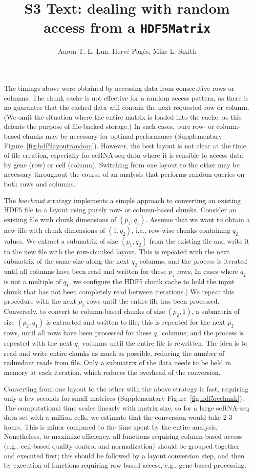 \documentclass{article}
\title{S3 Text: dealing with random access from a \texttt{HDF5Matrix}}
\author{Aaron T. L. Lun, Herv\'e Pag\`es, Mike L. Smith}
\newcommand{\beachmat}{\textit{beachmat}}
\begin{document}
\maketitle

\noindent
The timings above were obtained by accessing data from consecutive rows or columns.
The chunk cache is not effective for a random access pattern, as there is no guarantee that the cached data will contain the next requested row or column.
(We omit the situation where the entire matrix is loaded into the cache, as this defeats the purpose of file-backed storage.)
In such cases, pure row- or column-based chunks may be necessary for optimal performance (Supplementary Figure~\ref{fig:hdf5layoutrandom}).
However, the best layout is not clear at the time of file creation, especially for scRNA-seq data where it is sensible to access data by gene (row) or cell (column).
Switching from one layout to the other may be necessary throughout the course of an analysis that performs random queries on both rows and columns.

The \beachmat{} strategy implements a simple approach to converting an existing HDF5 file to a layout using purely row- or column-based chunks.
Consider an existing file with chunk dimensions of $(p_1, q_1)$. 
Assume that we want to obtain a new file with chunk dimensions of $(1, q_2)$, i.e., row-wise chunks containing $q_2$ values.
We extract a submatrix of size $(p_1, q_2)$ from the existing file and write it to the new file with the row-chunked layout.
This is repeated with the next submatrix of the same size along the next $q_2$ columns, and the process is iterated until all columns have been read and written for these $p_1$ rows.
In cases where $q_2$ is not a multiple of $q_1$, we configure the HDF5 chunk cache to hold the input chunk that has not been completely read between iterations.)
We repeat this procedure with the next $p_1$ rows until the entire file has been processed.
Conversely, to convert to column-based chunks of size $(p_2, 1)$, a submatrix of size $(p_2, q_1)$ is extracted and written to file; this is repeated for the next $p_2$ rows, until all rows have been processed for these $q_1$ columns; and the process is repeated with the next $q_1$ columns until the entire file is rewritten.
The idea is to read and write entire chunks as much as possible, reducing the number of redundant reads from file.
Only a submatrix of the data needs to be held in memory at each iteration, which reduces the overhead of the conversion.

Converting from one layout to the other with the above strategy is fast, requiring only a few seconds for small matrices (Supplementary Figure~\ref{fig:hdf5rechunk}).
The computational time scales linearly with matrix size, so for a large scRNA-seq data set with a million cells, we estimate that the conversion would take 2-3 hours.
This is minor compared to the time spent by the entire analysis.
Nonetheless, to maximize efficiency, all functions requiring column-based access (e.g., cell-based quality control and normalization) should be grouped together and executed first; 
this should be followed by a layout conversion step, and then by execution of functions requiring row-based access, e.g., gene-based processing.
\end{document}
